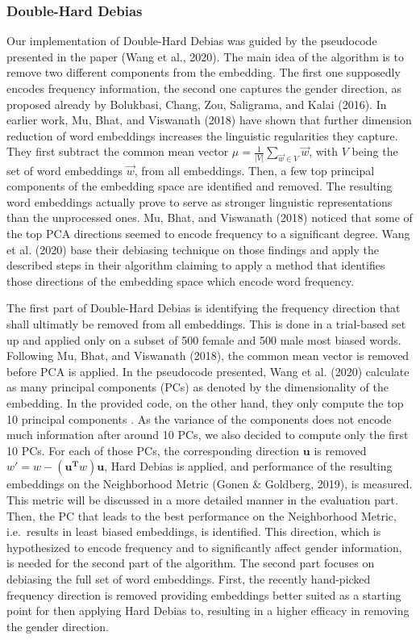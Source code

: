\documentclass[
  english,
  man,floatsintext]{apa6}
\begin{document}
\hypertarget{double-hard-debias}{%
\subsubsection{Double-Hard Debias}\label{double-hard-debias}}

Our implementation of Double-Hard Debias was guided by the pseudocode presented in the paper (Wang et al., 2020).
The main idea of the algorithm is to remove two different components from the embedding. The first one supposedly encodes frequency information, the second one captures the gender direction, as proposed already by Bolukbasi, Chang, Zou, Saligrama, and Kalai (2016).
In earlier work, Mu, Bhat, and Viswanath (2018) have shown that further dimension reduction of word embeddings increases the linguistic regularities they capture. They first subtract the common mean vector \(\mu = \frac{1}{|V|}\sum_{\vec{w} \in V}\vec{w}\), with \(V\) being the set of word embeddings \(\vec{w}\), from all embeddings. Then, a few top principal components of the embedding space are identified and removed. The resulting word embeddings actually prove to serve as stronger linguistic representations than the unprocessed ones. Mu, Bhat, and Viswanath (2018) noticed that some of the top PCA directions seemed to encode frequency to a significant degree. Wang et al. (2020) base their debiasing technique on those findings and apply the described steps in their algorithm claiming to apply a method that identifies those directions of the embedding space which encode word frequency.

The first part of Double-Hard Debias is identifying the frequency direction that shall ultimatly be removed from all embeddings. This is done in a trial-based set up and applied only on a subset of 500 female and 500 male most biased words. Following Mu, Bhat, and Viswanath (2018), the common mean vector is removed before PCA is applied. In the pseudocode presented, Wang et al. (2020) calculate as many principal components (PCs) as denoted by the dimensionality of the embedding. In the provided code, on the other hand, they only compute the top 10 principal components . As the variance of the components does not encode much information after around 10 PCs, we also decided to compute only the first 10 PCs.
For each of those PCs, the corresponding direction \(\mathbf{u}\) is removed \(w' = w - (\mathbf{u^{T}}w)\mathbf{u}\), Hard Debias is applied, and performance of the resulting embeddings on the Neighborhood Metric (Gonen \& Goldberg, 2019), is measured. This metric will be discussed in a more detailed manner in the evaluation part. Then, the PC that leads to the best performance on the Neighborhood Metric, i.e.~results in least biased embeddings, is identified. This direction, which is hypothesized to encode frequency and to significantly affect gender information, is needed for the second part of the algorithm.
The second part focuses on debiasing the full set of word embeddings. First, the recently hand-picked frequency direction is removed providing embeddings better suited as a starting point for then applying Hard Debias to, resulting in a higher efficacy in removing the gender direction.
\end{document}
